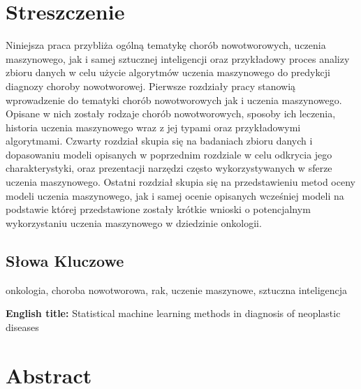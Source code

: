 \documentclass[a4paper,12pt,oneside]{book}
\begin{document}
\sloppy
\thispagestyle{empty}

\newpage{}

\chapter*{Streszczenie}
Niniejsza praca przybliża ogólną tematykę chorób nowotworowych, uczenia maszynowego, jak i samej sztucznej inteligencji oraz przykładowy proces analizy zbioru danych w celu użycie algorytmów uczenia maszynowego do predykcji diagnozy choroby nowotworowej.\newline
Pierwsze rozdziały pracy stanowią wprowadzenie do tematyki chorób nowotworowych jak i uczenia maszynowego. Opisane w nich zostały rodzaje chorób nowotworowych, sposoby ich leczenia, historia uczenia maszynowego wraz z jej typami oraz przykładowymi algorytmami.\newline
Czwarty rozdział skupia się na badaniach zbioru danych i dopasowaniu modeli opisanych w poprzednim rozdziale w celu odkrycia jego charakterystyki, oraz prezentacji narzędzi często wykorzystywanych w sferze uczenia maszynowego.\newline
Ostatni rozdział skupia się na przedstawieniu metod oceny modeli uczenia maszynowego, jak i samej ocenie opisanych wcześniej modeli na podstawie której przedstawione zostały krótkie wnioski o potencjalnym wykorzystaniu uczenia maszynowego w dziedzinie onkologii.

\section*{Słowa Kluczowe}
onkologia, choroba nowotworowa, rak, uczenie maszynowe, sztuczna inteligencja

\newpage{}

\textbf{English title:} Statistical machine learning methods in diagnosis of neoplastic diseases

\begingroup
\let\clearpage\relax
\chapter*{Abstract}
\endgroup
\end{document}
